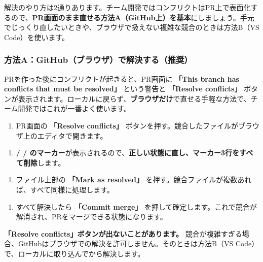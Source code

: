 解決のやり方は2通りあります。チーム開発ではコンフリクトはPR上で表面化するので、\textbf{PR画面のまま直せる方法A（GitHub上）を基本}にしましょう。手元でじっくり直したいときや、ブラウザで扱えない複雑な競合のときは方法B（VS Code）を使います。

\subsubsection{方法A：GitHub（ブラウザ）で解決する（推奨）}

PRを作った後にコンフリクトが起きると、PR画面に \textbf{「This branch has conflicts that must be resolved」} という警告と \textbf{「Resolve conflicts」} ボタンが表示されます。ローカルに戻らず、\textbf{ブラウザだけ}で直せる手軽な方法で、チーム開発ではこれが一番よく使います。

\begin{enumerate}[leftmargin=1.6em]
  \item PR画面の \textbf{「Resolve conflicts」} ボタンを押す。競合したファイルがブラウザ上のエディタで開きます。
\end{enumerate}

\begin{enumerate}[leftmargin=1.6em, start=2]
  \item \textbf{\cmd{<<<<<<<} / \cmd{=======} / \cmd{>>>>>>>} のマーカー}が表示されるので、\textbf{正しい状態に直し、マーカー3行をすべて削除}します。
\end{enumerate}

\begin{enumerate}[leftmargin=1.6em, start=3]
  \item ファイル上部の \textbf{「Mark as resolved」} を押す。競合ファイルが複数あれば、すべて同様に処理します。
\end{enumerate}

\begin{enumerate}[leftmargin=1.6em, start=4]
  \item すべて解決したら \textbf{「Commit merge」} を押して確定します。これで競合が解消され、PRをマージできる状態になります。
\end{enumerate}

\begin{warnbox}
\textbf{「Resolve conflicts」ボタンが出ないことがあります。} 競合が複雑すぎる場合、GitHubはブラウザでの解決を許可しません。そのときは方法B（VS Code）で、ローカルに取り込んでから解決します。
\end{warnbox}

